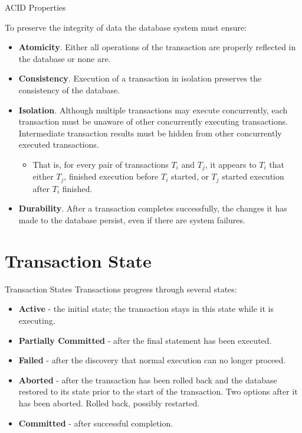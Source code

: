 \documentclass[aspectratio=169]{beamer}
\begin{document}
\begin{frame}{ACID Properties}

    \scriptsize
    To preserve the integrity of data the database system must ensure:
        \begin{itemize}
            \item \textbf{Atomicity}. Either all operations of the transaction are properly reflected in the database or none are.
            \item \textbf{Consistency}. Execution of a transaction in isolation preserves the consistency of the database.
            \item \textbf{Isolation}. Although multiple transactions may execute concurrently, each transaction must be unaware of other concurrently executing transactions. Intermediate transaction results must be hidden from other concurrently executed transactions.
                \begin{itemize}
                    \scriptsize
                    \item That is, for every pair of transactions $T_i$ and $T_j$, it appears to $T_i$ that either $T_j$, finished execution before $T_i$ started, or $T_j$ started execution after $T_i$ finished.
                \end{itemize}
            \item \textbf{Durability}. After a transaction completes successfully, the changes it has made to the database persist, even if there are system failures.
        \end{itemize}

\end{frame}

\section{Transaction State}

\begin{frame}{Transaction States}
    Transactions progress through several states:
    \begin{itemize}
        \item \textbf{Active} - the initial state; the transaction stays in this state while it is executing.
        \item \textbf{Partially Committed} - after the final statement has been executed.
        \item \textbf{Failed} - after the discovery that normal execution can no longer proceed.
        \item \textbf{Aborted} - after the transaction has been rolled back and the database restored to its state prior to the start of the transaction. Two options after it has been aborted.  Rolled back, possibly restarted.
        \item \textbf{Committed} - after successful completion.
    \end{itemize}
\end{frame}
\end{document}
